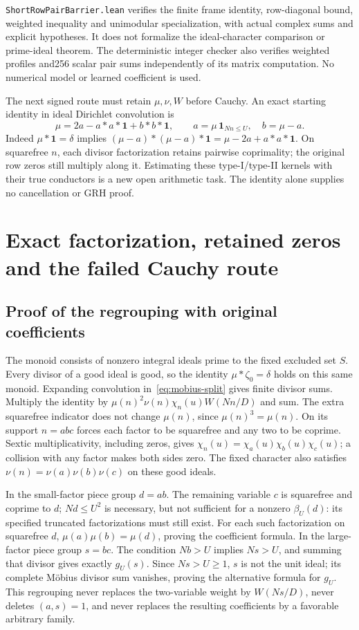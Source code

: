 \documentclass[11pt]{article}
\theoremstyle{definition}\newtheorem{definition}[theorem]{Definition}
\theoremstyle{remark}\newtheorem{remark}[theorem]{Remark}
\begin{document}
\texttt{ShortRowPairBarrier.lean} verifies the finite frame identity,
row-diagonal bound, weighted inequality and unimodular specialization,
with actual complex sums and explicit hypotheses. It does not formalize
the ideal-character comparison or prime-ideal theorem. The deterministic
integer checker also verifies weighted profiles and256 scalar pair sums
independently of its matrix computation. No numerical model or learned
coefficient is used.

The next signed route must retain $\mu,\nu,W$ before Cauchy. An exact
starting identity in ideal Dirichlet convolution is
\[
 \mu=2a-a*a*\mathbf1+b*b*\mathbf1,\qquad
 a=\mu\,\mathbf1_{Nn\le U},\quad b=\mu-a.
\]
Indeed $\mu*\mathbf1=\delta$ implies
$(\mu-a)*(\mu-a)*\mathbf1=\mu-2a+a*a*\mathbf1$.
On squarefree $n$, each divisor factorization retains pairwise
coprimality; the original row zeros still multiply along it. Estimating
these type-I/type-II kernels with their true conductors is a new open
arithmetic task. The identity alone supplies no cancellation or GRH proof.

\section{Exact factorization, retained zeros and the failed Cauchy route}
\label{sec:mobius-split-details}
\subsection{Proof of the regrouping with original coefficients}
The monoid consists of nonzero integral ideals prime to the fixed excluded
set $S$. Every divisor of a good ideal is good, so the identity
$\mu*\zeta_0=\delta$ holds on this same monoid. Expanding convolution
in~\eqref{eq:mobius-split} gives finite divisor sums. Multiply the identity
by $\mu(n)^2\nu(n)\chi_n(u)W(Nn/D)$ and sum. The extra squarefree
indicator does not change $\mu(n)$, since $\mu(n)^3=\mu(n)$.
On its support $n=abc$ forces each factor to be squarefree and any two
to be coprime. Sextic multiplicativity, including zeros, gives
$\chi_n(u)=\chi_a(u)\chi_b(u)\chi_c(u)$; a collision with any factor
makes both sides zero. The fixed character also satisfies
$\nu(n)=\nu(a)\nu(b)\nu(c)$ on these good ideals.

In the small-factor piece group $d=ab$. The remaining variable $c$ is
squarefree and coprime to $d$; $Nd\le U^2$ is necessary, but not sufficient
for a nonzero $\beta_U(d)$: its specified truncated factorizations must
still exist. For each such factorization on squarefree $d$,
$\mu(a)\mu(b)=\mu(d)$, proving the coefficient formula.
In the large-factor piece group $s=bc$. The condition $Nb>U$ implies
$Ns>U$, and summing that divisor gives exactly $g_U(s)$.
Since $Ns>U\ge1$, $s$ is not the unit ideal; its complete M\"obius
divisor sum vanishes, proving the alternative formula for $g_U$.
This regrouping never replaces the two-variable weight by $W(Ns/D)$,
never deletes $(a,s)=1$, and never replaces the resulting coefficients
by a favorable arbitrary family.
\end{document}
